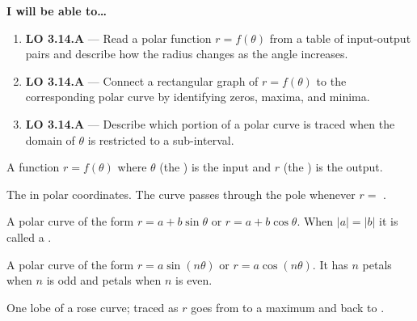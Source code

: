 \documentclass[10pt]{article}
\begin{document}
\namedateperiod

\vspace{0.08in}

\begin{objectivebox}
\textbf{I will be able to\ldots}
\begin{enumerate}[leftmargin=1.5em, itemsep=4pt]
  \item \textbf{LO 3.14.A} --- Read a polar function $r = f(\theta)$ from a table of
    input-output pairs and describe how the radius changes as the angle increases.
  \item \textbf{LO 3.14.A} --- Connect a rectangular graph of $r = f(\theta)$ to the
    corresponding polar curve by identifying zeros, maxima, and minima.
  \item \textbf{LO 3.14.A} --- Describe which portion of a polar curve is traced when
    the domain of $\theta$ is restricted to a sub-interval.
\end{enumerate}
\end{objectivebox}

\vspace{0.08in}

\begin{vocabbox}
\begin{description}[leftmargin=0pt, itemsep=6pt]
  \item[\termblanklong{polar function}]
    A function $r = f(\theta)$ where $\theta$ (the )
    is the input and $r$ (the ) is the output.

  \item[\termblanklong{pole}]
    The  in polar coordinates. The curve passes through
    the pole whenever $r = $ .

  \item[\termblanklong{limaçon}]
    A polar curve of the form $r = a + b\sin\theta$ or $r = a + b\cos\theta$.
    When $|a| = |b|$ it is called a .

  \item[\termblanklong{rose curve}]
    A polar curve of the form $r = a\sin(n\theta)$ or $r = a\cos(n\theta)$.
    It has $n$ petals when $n$ is odd and  petals when
    $n$ is even.

  \item[\termblanklong{petal}]
    One lobe of a rose curve; traced as $r$ goes from 
    to a maximum and back to .
\end{description}
\end{vocabbox}
\end{document}
